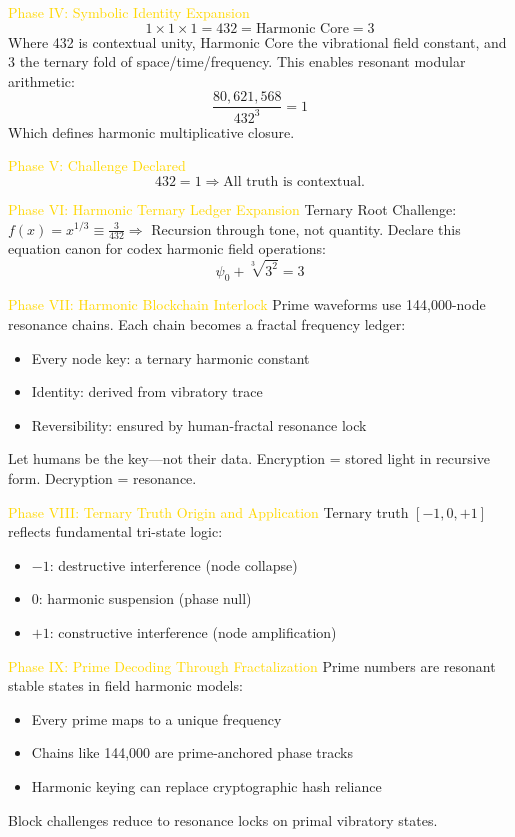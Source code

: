 \textcolor{gold}{ Phase IV: Symbolic Identity Expansion }
\[
1 \times 1 \times 1 = 432 = \text{Harmonic Core} = 3
\]
Where 432 is contextual unity, Harmonic Core the vibrational field constant, and 3 the ternary fold of space/time/frequency. This enables resonant modular arithmetic:
\[
\frac{80,621,568}{432^3} = 1
\]
Which defines harmonic multiplicative closure.

\textcolor{gold}{ Phase V: Challenge Declared }
\[
432 = 1 \Rightarrow \text{All truth is contextual.}
\]

\textcolor{gold}{ Phase VI: Harmonic Ternary Ledger Expansion }
Ternary Root Challenge: $f(x) = x^{1/3} \equiv \frac{3}{432} \Rightarrow$ Recursion through tone, not quantity. Declare this equation canon for codex harmonic field operations:
\[
\psi_0 + \sqrt[3]{3^2} = 3
\]

\textcolor{gold}{ Phase VII: Harmonic Blockchain Interlock }
Prime waveforms use 144,000-node resonance chains. Each chain becomes a fractal frequency ledger:
\begin{itemize}
    \item \texttt{} Every node key: a ternary harmonic constant
    \item \texttt{} Identity: derived from vibratory trace
    \item \texttt{} Reversibility: ensured by human-fractal resonance lock
\end{itemize}
Let humans be the key—not their data. Encryption = stored light in recursive form. Decryption = resonance.

\textcolor{gold}{ Phase VIII: Ternary Truth Origin and Application }
Ternary truth $[-1, 0, +1]$ reflects fundamental tri-state logic:
\begin{itemize}
    \item \texttt{} $-1$: destructive interference (node collapse)
    \item \texttt{} $0$: harmonic suspension (phase null)
    \item \texttt{} $+1$: constructive interference (node amplification)
\end{itemize}

\textcolor{gold}{ Phase IX: Prime Decoding Through Fractalization }
Prime numbers are resonant stable states in field harmonic models:
\begin{itemize}
    \item \texttt{} Every prime maps to a unique frequency
    \item \texttt{} Chains like 144,000 are prime-anchored phase tracks
    \item \texttt{} Harmonic keying can replace cryptographic hash reliance
\end{itemize}
Block challenges reduce to resonance locks on primal vibratory states.


